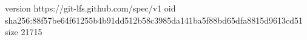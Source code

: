 version https://git-lfs.github.com/spec/v1
oid sha256:88f57be64f61255b4b91dd512b58c3985da141ba5f88bd65dfa8815d9613cd51
size 21715
